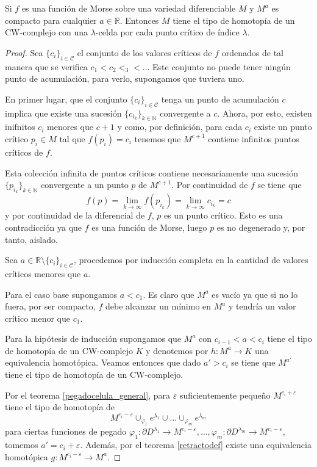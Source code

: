 \begin{theorem}
\label{cwvariedad}
    Si $f$ es una función de Morse sobre una variedad diferenciable $M$ y $M^a$ es compacto para cualquier $a\in\mathbb{R}$. Entonces $M$ tiene el tipo de homotopía de un CW-complejo con una $\lambda$-celda por cada punto crítico de índice $\lambda$.
\end{theorem}
\begin{proof}
    Sea $\{c_i\}_{i\in \mathcal{C}}$ el conjunto de los valores críticos de $f$ ordenados de tal manera que se verifica $c_1<c_2<_3<\dots$ Este conjunto no puede tener ningún punto de acumulación, para verlo, supongamos que tuviera uno.

    En primer lugar, que el conjunto $\{c_i\}_{i\in \mathcal{C}}$ tenga un punto de acumulación $c$ implica que existe una sucesión $\{c_{i_k}\}_{k\in \mathbb{N}}$ convergente a $c$. Ahora, por esto, existen inifnitos $c_i$ menores que $c+1$ y como, por definición, para cada $c_i$ existe un punto crítico $p_i\in M$ tal que $f(p_i) = c_i$ tenemos que $M^{c+1}$ contiene infinitos puntos críticos de $f$. 
    
    Esta colección infinita de puntos críticos contiene necesariamente una sucesión $\{p_{i_k}\}_{k\in \mathbb{N}}$ convergente a un punto $p$ de $M^{c+1}$. Por continuidad de $f$ se tiene que 
    \begin{equation*}
        f(p) = \lim_{k\to \infty} f(p_{i_k}) =  \lim_{k\to \infty} c_{i_k} = c
    \end{equation*}
    y por continuidad de la diferencial de $f$, $p$ es un punto crítico. Esto es una contradicción ya que $f$ es una función de Morse, luego $p$ es no degenerado y, por tanto, aislado.

    Sea $a\in\mathbb{R}\setminus\{c_i\}_{i\in \mathcal{C}}$, procedemos por inducción completa en la cantidad de valores críticos menores que $a$. 
    
    Para el caso base supongamos $a<c_1$. Es claro que $M^a$ es vacío ya que si no lo fuera, por ser compacto, $f$ debe alcanzar un mínimo en $M^a$ y tendría un valor crítico menor que $c_1$.

    Para la hipótesis de inducción supongamos que $M^a$ con $c_{i-1}<a<c_{i}$ tiene el tipo de homotopía de un CW-complejo $K$ y denotemos por $h:M^a\to K$ una equivalencia homotópica. Veamos entonces que dado $a'>c_{i}$ se tiene que $M^{a'}$ tiene el tipo de homotopía de un CW-complejo. 
    
    Por el teorema \ref{pegadocelula_general}, para $\varepsilon$ suficientemente pequeño $M^{c_i+\varepsilon}$ tiene el tipo de homotopía de 
    \begin{equation*}
        M^{c_i - \varepsilon}\cup_{\varphi_1} e^{\lambda_1} \cup\dots\cup_{\varphi_m} e^{\lambda_m}
    \end{equation*}
    para ciertas funciones de pegado $\varphi_1:\partial D^{\lambda_1}\to M^{c_i - \varepsilon},\dots,\varphi_m: \partial D^{\lambda_m}\to M^{c_i - \varepsilon}$, tomemos $a'=c_i+\varepsilon$. Además, por el teorema \ref{retractodef} existe una equivalencia homotópica $g: M^{c_i-\varepsilon}\to M^a$.


\end{proof}
